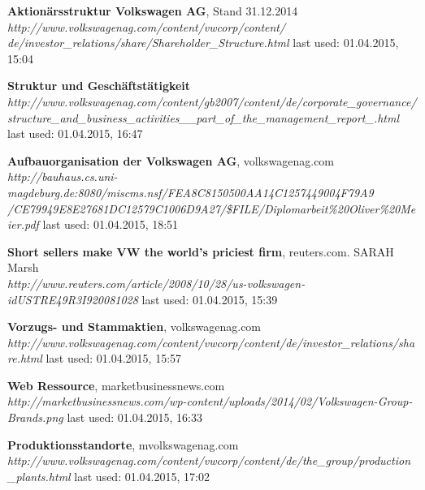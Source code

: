 \documentclass[12pt]{article}
\begin{document}
\begin{thebibliography}{56}
    
  \textbf{Aktionärsstruktur Volkswagen AG}, Stand 31.12.2014 \\
  \textit{http://www.volkswagenag.com/content/vwcorp/content/\\de/investor\_relations/share/Shareholder\_Structure.html}
  \newline last used: 01.04.2015, 15:04
    
  \textbf{Struktur und Geschäftstätigkeit}\\
  \textit{http://www.volkswagenag.com/content/gb2007/content/de/corporate\_governance/\\structure\_and\_business\_activities\_\_part\_of\_the\_management\_report\_.html}
  \newline last used: 01.04.2015, 16:47
  
  \textbf{Aufbauorganisation der Volkswagen AG}, volkswagenag.com \\
  \textit{http://bauhaus.cs.uni-magdeburg.de:8080/miscms.nsf/FEA8C8150500AA14C1257449004F79A9\\/CE79949E8E27681DC12579C1006D9A27/\$FILE/Diplomarbeit\%20Oliver\%20Meier.pdf}
  \newline last used: 01.04.2015, 18:51  
  
 \textbf{Short sellers make VW the world's priciest firm}, reuters.com. SARAH Marsh \\
  \textit{  http://www.reuters.com/article/2008/10/28/us-volkswagen-idUSTRE49R3I920081028}
  \newline last used: 01.04.2015, 15:39  
  
 \textbf{Vorzugs- und Stammaktien}, volkswagenag.com \\
  \textit{   http://www.volkswagenag.com/content/vwcorp/content/de/investor\_relations/share.html}
  \newline last used: 01.04.2015, 15:57
  
 \textbf{Web Ressource}, marketbusinessnews.com \\
  \textit{   http://marketbusinessnews.com/wp-content/uploads/2014/02/Volkswagen-Group-Brands.png}
  \newline last used: 01.04.2015, 16:33
  
 \textbf{Produktionsstandorte}, mvolkswagenag.com \\
  \textit{   http://www.volkswagenag.com/content/vwcorp/content/de/the\_group/production\_plants.html}
  \newline last used: 01.04.2015, 17:02
  

\end{thebibliography}
\end{document}
